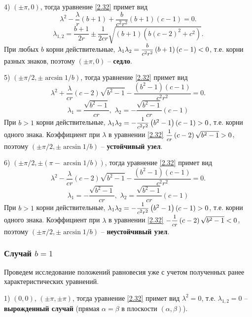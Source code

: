 \documentclass[a4paper,12pt, openany]{book}
\theoremstyle{plain} %
\theoremstyle{definition} %
\theoremstyle{remark} %
\numberwithin{equation}{chapter}
\begin{document}
{4) $(\pm\pi,0)$, тогда уравнение \eqref{2.32} примет вид
\[
\lambda ^2  - \frac{\lambda }{r}\left( {b + 1} \right) + \frac{b}{{c^2 r^2 }}\left( {b + 1} \right)\left( {c - 1} \right) = 0.
\]
\[
\lambda _{1,2}  = \frac{{b + 1}}{{2r}} \pm \frac{1}{{2cr}}\sqrt {\left( {b + 1} \right)\left( {b\left( {c - 2} \right)^2  + c^2 } \right)} .
\]
При любых $b$ корни действительные, $
\lambda _1 \lambda _2  = \mfrac{b}{{c^2 r^2 }}\left( {b + 1} \right)\left( {c - 1} \right) < 0
$, т.е. корни разных знаков, поэтому $(\pm\pi,0)$ -- \textbf{седло}. 

5) $(\pm\pi/2, \pm\arcsin 1/b)$, тогда уравнение \eqref{2.32} примет вид  
\[
\lambda ^2  + \frac{\lambda }{{cr}}\left( {c - 2} \right)\sqrt {b^2  - 1}  - \frac{{\left( {b^2  - 1} \right)\left( {c - 1} \right)}}{{c^2 r^2 }} = 0.
\]
\[
\lambda _1  = \frac{{\sqrt {b^2  - 1} }}{{cr}},\,\,\lambda _2  =  - \frac{{\sqrt {b^2  - 1} }}{{cr}}\left( {c - 1} \right)
\]
При $b>1$ корни действительные, $
\lambda _1 \lambda _2  =  - \mfrac{1}{{c^2 r^2 }}\left( {b^2  - 1} \right)\left( {c - 1} \right) > 0
$, т.е. корни одного знака. Коэффициент при $\lambda$ в уравнении \eqref{2.32} $
\mfrac{1}{{cr}}\left( {c - 2} \right)\sqrt {b^2  - 1}  > 0
$, поэтому $(\pm\pi/2, \pm\arcsin 1/b)$ -- \textbf{устойчивый узел}. 

6) $(\pm\pi/2, \pm(\pi - \arcsin 1/b))$, тогда уравнение \eqref{2.32} примет вид
\[
\lambda ^2  - \frac{\lambda }{{cr}}\left( {c - 2} \right)\sqrt {b^2  - 1}  - \frac{{\left( {b^2  - 1} \right)\left( {c - 1} \right)}}{{c^2 r^2 }} = 0.
\]
\[
\lambda _1  =  - \frac{{\sqrt {b^2  - 1} }}{{cr}},\,\,\lambda _2  = \frac{{\sqrt {b^2  - 1} }}{{cr}}\left( {c - 1} \right)
\]
При $b>1$ корни действительные, $
\lambda _1 \lambda _2  =  - \mfrac{1}{{c^2 r^2 }}\left( {b^2  - 1} \right)\left( {c - 1} \right) > 0
$, т.е. корни одного знака. Коэффициент при $\lambda$ в уравнении \eqref{2.32} $
-\mfrac{1}{{cr}}\left( {c - 2} \right)\sqrt {b^2  - 1}  < 0
$, поэтому $(\pm\pi/2, \pm\arcsin 1/b)$ -- \textbf{неустойчивый узел}.
\subsubsection*{Случай $b=1$}

Проведем исследование положений равновесия уже с учетом полученных ранее характеристических уравнений.

1) $(0,0)$, $(\pm\pi, \pm\pi)$, тогда уравнение \eqref{2.32} примет вид $\lambda^2 = 0$, т.е. $\lambda_{1,2} = 0$ -- \textbf{вырожденный случай} (прямая $\alpha = \beta$ в плоскости $(\alpha,\beta)$).

}
\end{document}
